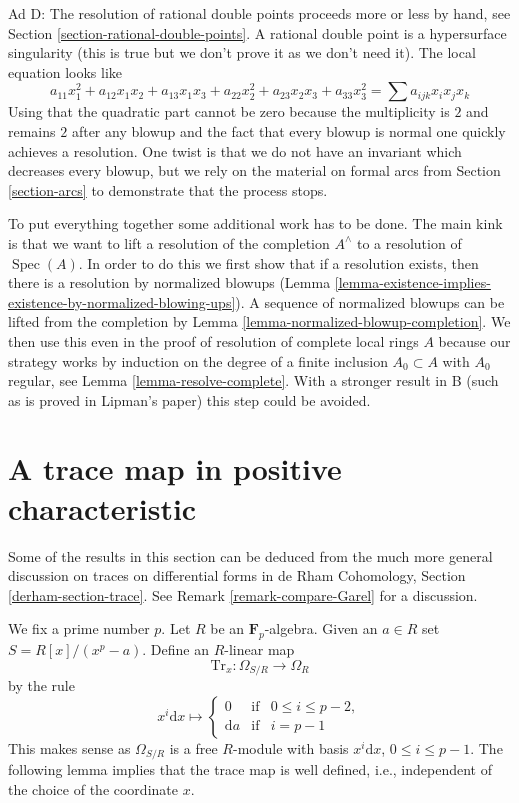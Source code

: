 \documentclass{stacks-project}
\theoremstyle{plain}
\theoremstyle{definition}
\theoremstyle{remark}
\numberwithin{equation}{subsection}
\def\Spec{\mathop{\mathrm{Spec}}}
\begin{document}
\medskip\noindent
Ad D: The resolution of rational double points proceeds more or
less by hand, see
Section \ref{section-rational-double-points}.
A rational double point
is a hypersurface singularity (this is true but we don't prove it
as we don't need it). The local equation looks like
$$
a_{11} x_1^2 + a_{12} x_1x_2 + a_{13}x_1x_3 + a_{22} x_2^2 +
a_{23} x_2x_3 + a_{33} x_3^2 =
\sum a_{ijk} x_ix_jx_k
$$
Using that the quadratic part cannot be zero because the multiplicity
is $2$ and remains $2$ after any blowup and the fact that every blowup
is normal one quickly achieves a resolution. One twist is that we
do not have an invariant which decreases every blowup, but we rely
on the material on formal arcs from Section \ref{section-arcs}
to demonstrate that the process stops.

\medskip\noindent
To put everything together some additional work has
to be done. The main kink is that we want to lift a resolution
of the completion $A^\wedge$ to a resolution of $\Spec(A)$.
In order to do this we first show that if a resolution exists,
then there is a resolution by normalized blowups
(Lemma \ref{lemma-existence-implies-existence-by-normalized-blowing-ups}).
A sequence of normalized blowups can be lifted from the completion
by Lemma \ref{lemma-normalized-blowup-completion}.
We then use this even in the proof of resolution of complete
local rings $A$ because our strategy works by induction
on the degree of a finite inclusion $A_0 \subset A$ with
$A_0$ regular, see Lemma \ref{lemma-resolve-complete}.
With a stronger result in B (such as is proved in Lipman's paper)
this step could be avoided.




\section{A trace map in positive characteristic}
\label{section-trace}

\noindent
Some of the results in this section can be deduced from the much more
general discussion on traces on differential forms in
de Rham Cohomology, Section \ref{derham-section-trace}.
See Remark \ref{remark-compare-Garel} for a discussion.

\medskip\noindent
We fix a prime number $p$. Let $R$ be an $\mathbf{F}_p$-algebra.
Given an $a \in R$ set $S = R[x]/(x^p - a)$. Define an $R$-linear map
$$
\text{Tr}_x : \Omega_{S/R} \longrightarrow \Omega_R
$$
by the rule
$$
x^i\text{d}x \longmapsto
\left\{
\begin{matrix}
0 & \text{if} & 0 \leq i \leq p - 2, \\
\text{d}a & \text{if} & i = p - 1
\end{matrix}
\right.
$$
This makes sense as $\Omega_{S/R}$ is a free $R$-module with
basis $x^i\text{d}x$, $0 \leq i \leq p - 1$.
The following lemma implies that the trace map is well defined,
i.e., independent of the choice of the coordinate $x$.
\end{document}
